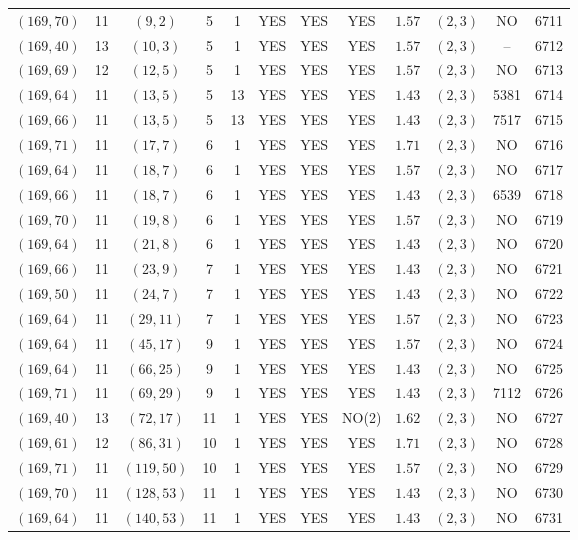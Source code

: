 \begin{longtable}{|c|c|c|c|c|c|c|c|c|c|c|c|}
$(169,70)$ & 11 & $(9,2)$ & 5 & 1 & YES & YES & YES & $1.57$ & $(2,3)$ & NO & 6711\\
$(169,40)$ & 13 & $(10,3)$ & 5 & 1 & YES & YES & YES & $1.57$ & $(2,3)$ & -- & 6712\\
$(169,69)$ & 12 & $(12,5)$ & 5 & 1 & YES & YES & YES & $1.57$ & $(2,3)$ & NO & 6713\\
$(169,64)$ & 11 & $(13,5)$ & 5 & 13 & YES & YES & YES & $1.43$ & $(2,3)$ & 5381 & 6714\\
$(169,66)$ & 11 & $(13,5)$ & 5 & 13 & YES & YES & YES & $1.43$ & $(2,3)$ & 7517 & 6715\\
$(169,71)$ & 11 & $(17,7)$ & 6 & 1 & YES & YES & YES & $1.71$ & $(2,3)$ & NO & 6716\\
$(169,64)$ & 11 & $(18,7)$ & 6 & 1 & YES & YES & YES & $1.57$ & $(2,3)$ & NO & 6717\\
$(169,66)$ & 11 & $(18,7)$ & 6 & 1 & YES & YES & YES & $1.43$ & $(2,3)$ & 6539 & 6718\\
$(169,70)$ & 11 & $(19,8)$ & 6 & 1 & YES & YES & YES & $1.57$ & $(2,3)$ & NO & 6719\\
$(169,64)$ & 11 & $(21,8)$ & 6 & 1 & YES & YES & YES & $1.43$ & $(2,3)$ & NO & 6720\\
$(169,66)$ & 11 & $(23,9)$ & 7 & 1 & YES & YES & YES & $1.43$ & $(2,3)$ & NO & 6721\\
$(169,50)$ & 11 & $(24,7)$ & 7 & 1 & YES & YES & YES & $1.43$ & $(2,3)$ & NO & 6722\\
$(169,64)$ & 11 & $(29,11)$ & 7 & 1 & YES & YES & YES & $1.57$ & $(2,3)$ & NO & 6723\\
$(169,64)$ & 11 & $(45,17)$ & 9 & 1 & YES & YES & YES & $1.57$ & $(2,3)$ & NO & 6724\\
$(169,64)$ & 11 & $(66,25)$ & 9 & 1 & YES & YES & YES & $1.43$ & $(2,3)$ & NO & 6725\\
$(169,71)$ & 11 & $(69,29)$ & 9 & 1 & YES & YES & YES & $1.43$ & $(2,3)$ & 7112 & 6726\\
$(169,40)$ & 13 & $(72,17)$ & 11 & 1 & YES & YES & NO(2) & $1.62$ & $(2,3)$ & NO & 6727\\
$(169,61)$ & 12 & $(86,31)$ & 10 & 1 & YES & YES & YES & $1.71$ & $(2,3)$ & NO & 6728\\
$(169,71)$ & 11 & $(119,50)$ & 10 & 1 & YES & YES & YES & $1.57$ & $(2,3)$ & NO & 6729\\
$(169,70)$ & 11 & $(128,53)$ & 11 & 1 & YES & YES & YES & $1.43$ & $(2,3)$ & NO & 6730\\
$(169,64)$ & 11 & $(140,53)$ & 11 & 1 & YES & YES & YES & $1.43$ & $(2,3)$ & NO & 6731\\

\end{longtable}

